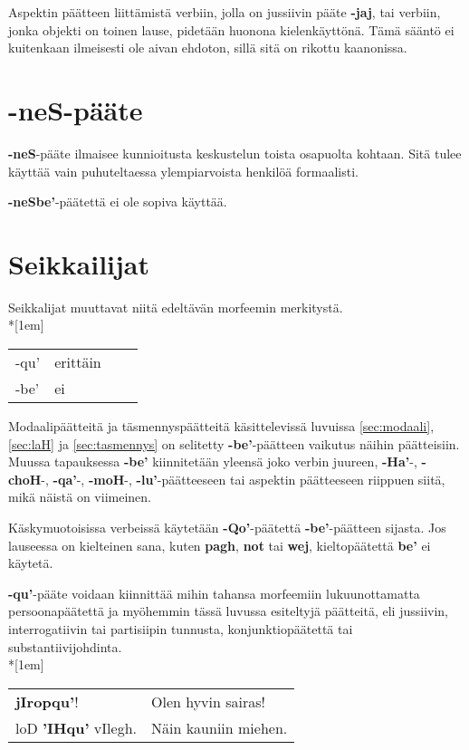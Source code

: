 \documentclass{book}
\begin{document}
Aspektin päätteen liittämistä verbiin, jolla on jussiivin pääte \textbf{-jaj}, tai verbiin, jonka objekti on toinen lause, pidetään huonona kielenkäyttönä. Tämä sääntö ei kuitenkaan ilmeisesti ole aivan ehdoton, sillä sitä on rikottu kaanonissa.

\section{-neS-pääte}

\textbf{-neS}-pääte ilmaisee kunnioitusta keskustelun toista osapuolta kohtaan.
Sitä tulee käyttää vain puhuteltaessa ylempiarvoista henkilöä formaalisti.

\textbf{-neSbe'}-päätettä ei ole sopiva käyttää.

\section{Seikkailijat}

Seikkalijat muuttavat niitä edeltävän morfeemin merkitystä.
\\*[1em]
\begin{tabular}{Bl Il}
    -qu' & erittäin \\
    -be' & ei \\
\end{tabular}

Modaalipäätteitä ja täsmennyspäätteitä käsittelevissä luvuissa \ref{sec:modaali}, \ref{sec:laH} ja \ref{sec:tasmennys} on selitetty \textbf{-be'}-päätteen vaikutus näihin päätteisiin.
Muussa tapauksessa \textbf{-be'} kiinnitetään yleensä joko verbin juureen, \textbf{-Ha'}-, \textbf{-choH}-, \textbf{-qa'}-, \textbf{-moH}-, \textbf{-lu'}-päätteeseen tai aspektin päätteeseen riippuen siitä, mikä näistä on viimeinen.

Käskymuotoisissa verbeissä käytetään \textbf{-Qo'}-päätettä \textbf{-be'}-päätteen sijasta.
Jos lauseessa on kielteinen sana, kuten \textbf{pagh}, \textbf{not} tai \textbf{wej}, kieltopäätettä \textbf{be'} ei käytetä.

\textbf{-qu'}-pääte voidaan kiinnittää mihin tahansa morfeemiin lukuunottamatta persoonapäätettä ja myöhemmin tässä luvussa esiteltyjä päätteitä, eli jussiivin, interrogatiivin tai partisiipin tunnusta, konjunktiopäätettä tai substantiivijohdinta.\\*[1em]
\begin{tabular}{l l}
    \textbf{jIropqu'}! & Olen hyvin sairas! \\
    loD \textbf{'IHqu'} vIlegh. & Näin kauniin miehen. \\
\end{tabular}
\end{document}
